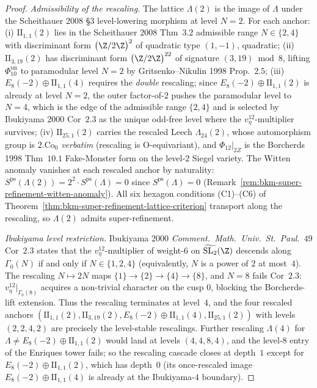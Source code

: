 \begin{proof}
\emph{Admissibility of the rescaling.} The lattice $\Lambda(2)$ is
the image of $\Lambda$ under the Scheithauer 2008 \S$3$
level-lowering morphism at level $N=2$. For each anchor:
\textup{(i)} $\mathrm{II}_{1,1}(2)$ lies in the Scheithauer 2008
Thm~$3.2$ admissible range $N\in\{2,4\}$ with discriminant form
$\bigl(\Z/2\Z\bigr)^2$ of quadratic type $(1,-1)$, quadratic;
\textup{(ii)} $\mathrm{II}_{3,19}(2)$ has discriminant form
$\bigl(\Z/2\Z\bigr)^{22}$ of signature $(3,19)\bmod 8$, lifting
\(\Phi_{10}^{\mathrm{un}}\) to paramodular level $N=2$ by Gritsenko--Nikulin 1998
Prop.~$2.5$;
\textup{(iii)} $E_8(-2)\oplus\mathrm{II}_{1,1}(4)$ requires the
\emph{double} rescaling; since $E_8(-2)\oplus\mathrm{II}_{1,1}(2)$
is already at level $N=2$, the outer factor-of-$2$ pushes the
paramodular level to $N=4$, which is the edge of the admissible
range $\{2,4\}$ and is selected by Ibukiyama 2000 Cor~$2.3$ as the
unique odd-free level where the $v_\eta^{12}$-multiplier survives;
\textup{(iv)} $\mathrm{II}_{25,1}(2)$ carries the rescaled Leech
$\Lambda_{24}(2)$, whose automorphism group is $2.\mathrm{Co}_0$
\emph{verbatim} (rescaling is $\mathrm{O}$-equivariant), and
$\Phi_{12}|_{2Z}$ is the Borcherds 1998 Thm~$10.1$ Fake-Monster
form on the level-$2$ Siegel variety.
The Witten anomaly vanishes at each rescaled anchor by naturality:
$S^{\mathrm{ps}}(\Lambda(2)) = 2^2\cdot S^{\mathrm{ps}}(\Lambda) = 0$
since $S^{\mathrm{ps}}(\Lambda) = 0$
(Remark~\ref{rem:bkm-super-refinement-witten-anomaly}). All six
hexagon conditions (C1)--(C6) of
Theorem~\ref{thm:bkm-super-refinement-lattice-criterion} transport
along the rescaling, so $\Lambda(2)$ admits super-refinement.

\emph{Ibukiyama level restriction.} Ibukiyama 2000
\emph{Comment.~Math.~Univ.~St.~Paul.}~$49$ Cor~$2.3$ states that the
$v_\eta^{12}$-multiplier of weight-$6$ on
$\widetilde{\mathrm{SL}_2}(\Z)$ descends along $\Gamma_0(N)$ if and
only if $N\in\{1,2,4\}$ (equivalently, $N$ is a power of $2$ at
most~$4$). The rescaling $N\mapsto 2N$ maps
$\{1\}\to\{2\}\to\{4\}\to\{8\}$, and $N=8$ fails Cor~$2.3$:
$v_\eta^{12}|_{\Gamma_0(8)}$ acquires a non-trivial character on the
cusp $0$, blocking the Borcherds-lift extension. Thus the rescaling
terminates at level~$4$, and the four rescaled anchors
$(\mathrm{II}_{1,1}(2),\mathrm{II}_{3,19}(2),
E_8(-2)\oplus\mathrm{II}_{1,1}(4),\mathrm{II}_{25,1}(2))$ with levels
$(2,2,4,2)$ are precisely the level-stable rescalings. Further
rescaling $\Lambda(4)$ for $\Lambda\neq E_8(-2)\oplus\mathrm{II}_{1,1}(2)$
would land at levels $(4,4,8,4)$, and the level-$8$ entry of the
Enriques tower fails; so the rescaling cascade closes at depth~$1$
except for $E_8(-2)\oplus\mathrm{II}_{1,1}(2)$, which has depth~$0$
(its once-rescaled image $E_8(-2)\oplus\mathrm{II}_{1,1}(4)$ is
already at the Ibukiyama-$4$ boundary).


\end{proof}
